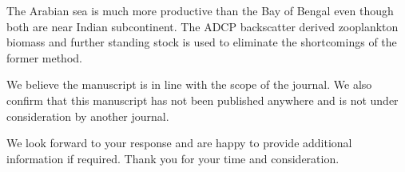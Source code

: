 \documentclass[11pt,a4paper,roman]{moderncv}        %
\begin{document}
	The Arabian sea is much more productive than the Bay of Bengal even though both are near Indian subcontinent.  The ADCP backscatter derived zooplankton biomass and further standing stock is used to eliminate the shortcomings of the former method.
	
	We believe the manuscript is in line with the scope of the journal. We also confirm that this manuscript has not been published anywhere and is not under consideration by another journal.
	
	We look forward to your response and are happy to provide additional information if required. Thank you for your time and consideration.
	
	\makeletterclosing
	
\end{document}
